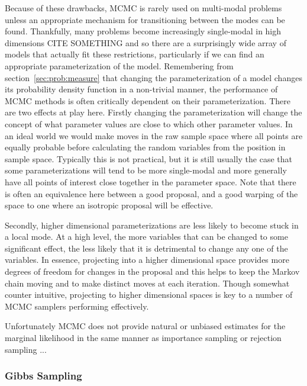 Because of these drawbacks, MCMC is rarely used on multi-modal problems unless an appropriate mechanism
for transitioning between the modes can be found.  Thankfully, many problems become increasingly single-modal
in high dimensions CITE SOMETHING and so there are a surprisingly wide array of models that actually 
fit these restrictions, particularly if we can find an appropriate parameterization of the model.  Remembering
from section~\ref{sec:prob:measure} that changing the parameterization of a model changes its probability
density function in a non-trivial manner, the performance of MCMC methods is often critically dependent on
their parameterization.  There are two effects at play here. Firstly changing the parameterization will change
the concept of what parameter values are close to which other parameter values.  In an ideal world we
would make moves in the raw sample space where all points are equally probable before calculating the
random variables from the position in sample space.  Typically this is not practical, but it is still usually the
case that some parameterizations will tend to be more single-modal and more generally have all points of
interest close together in the parameter space.  Note that there is often an equivalence here between a good proposal,
and a good warping of the space to one where an isotropic proposal will be effective.  

Secondly, higher dimensional parameterizations are less likely to become stuck in a local mode.
At a high level, the more variables that can be changed to some significant effect, the less likely that
it is detrimental to change any one of the variables.  In essence, projecting into a higher dimensional
space provides more degrees of freedom for changes in the proposal and this helps to keep the Markov
chain moving and to make distinct moves at each iteration.  Though somewhat counter intuitive, projecting
to higher dimensional spaces is key to a number of MCMC samplers performing effectively.

Unfortunately MCMC does not provide natural or unbiased estimates for the marginal likelihood in
the same manner as importance sampling or rejection sampling ...

\subsubsection{Gibbs Sampling}
\label{sec:inf:foundation:gibbs}

